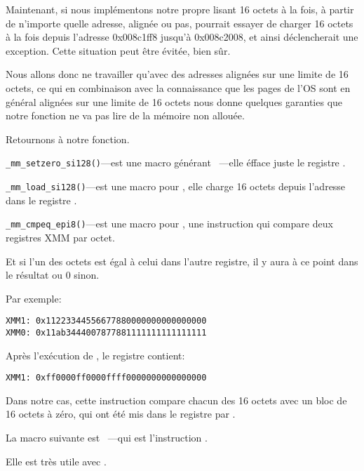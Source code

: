 Maintenant, si nous implémentons notre propre \strlen lisant 16 octets à la fois,
à partir de n'importe quelle adresse, alignée ou pas, \MOVDQU pourrait essayer de
charger 16 octets à la fois depuis l'adresse 0x008c1ff8 jusqu'à 0x008c2008, et ainsi
déclencherait une exception.
Cette situation peut être évitée, bien sûr.

Nous allons donc ne travailler qu'avec des adresses alignées sur une limite de 16
octets, ce qui en combinaison avec la connaissance que les pages de l'\ac{OS} sont
en général alignées sur une limite de 16 octets nous donne quelques garanties que
notre fonction ne va pas lire de la mémoire non allouée.

Retournons à notre fonction.

\verb|_mm_setzero_si128()|---est une macro générant ~---elle
éfface juste le registre .

\verb|_mm_load_si128()|---est une macro pour \MOVDQA, elle charge 16 octets depuis l'adresse dans le registre .

\verb|_mm_cmpeq_epi8()|---est une macro pour \PCMPEQB, une instruction qui compare deux registres XMM par octet.

Et si l'un des octets est égal à celui dans l'autre registre, il y aura 
à ce point dans le résultat ou 0 sinon.

Par exemple:

\begin{verbatim}
XMM1: 0x11223344556677880000000000000000
XMM0: 0x11ab3444007877881111111111111111
\end{verbatim}

Après l'exécution de , le registre  contient:

\begin{verbatim}
XMM1: 0xff0000ff0000ffff0000000000000000
\end{verbatim}

Dans notre cas, cette instruction compare chacun des 16 octets avec un bloc de 16
octets à zéro, qui ont été mis dans le registre  par .


La macro suivante est ~---qui est l'instruction .

Elle est très utile avec \PCMPEQB.


